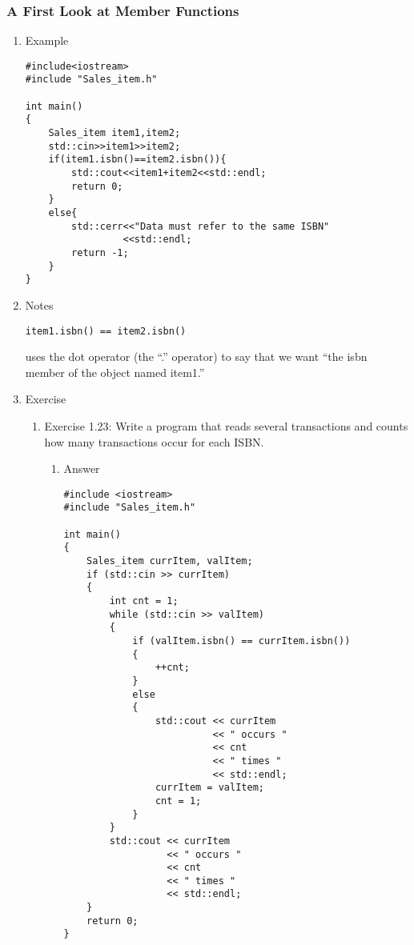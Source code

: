 \documentclass[11pt]{article}
\begin{document}
\subsubsection{A First Look at Member Functions}
\label{sec-1-5-2}
\begin{enumerate}
\item Example
\label{sec-1-5-2-1}
\begin{verbatim}
#include<iostream>
#include "Sales_item.h"

int main()
{
    Sales_item item1,item2;
    std::cin>>item1>>item2;
    if(item1.isbn()==item2.isbn()){
        std::cout<<item1+item2<<std::endl;
        return 0;
    }
    else{
        std::cerr<<"Data must refer to the same ISBN"
                 <<std::endl;
        return -1;
    }
}
\end{verbatim}
\item Notes
\label{sec-1-5-2-2}
\begin{verbatim}
item1.isbn() == item2.isbn()
\end{verbatim}
uses the dot operator (the “.” operator) to say that we want “the isbn member of the object named item1.” 
\item Exercise
\label{sec-1-5-2-3}
\begin{enumerate}
\item Exercise 1.23: Write a program that reads several transactions and counts how many transactions occur for each ISBN.
\label{sec-1-5-2-3-1}
\begin{enumerate}
\item Answer
\label{sec-1-5-2-3-1-1}
\begin{verbatim}
#include <iostream>
#include "Sales_item.h"

int main()
{
    Sales_item currItem, valItem;
    if (std::cin >> currItem)
    {
        int cnt = 1;
        while (std::cin >> valItem)
        {
            if (valItem.isbn() == currItem.isbn())
            {
                ++cnt;
            }
            else
            {
                std::cout << currItem 
                          << " occurs " 
                          << cnt 
                          << " times "
                          << std::endl;
                currItem = valItem;
                cnt = 1;
            }
        }
        std::cout << currItem
                  << " occurs "
                  << cnt 
                  << " times " 
                  << std::endl;
    }
    return 0;
}
\end{verbatim}
\end{enumerate}
\end{enumerate}
\end{enumerate}
\end{document}
